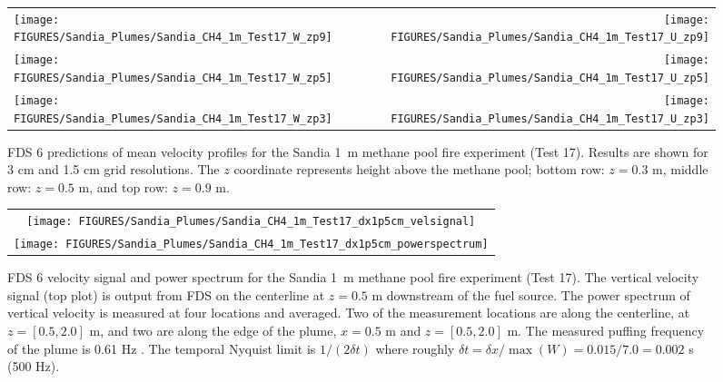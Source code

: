 \begin{figure}[p]
\begin{tabular*}{\textwidth}{l@{\extracolsep{\fill}}r}
\texttt{[image: FIGURES/Sandia\_Plumes/Sandia\_CH4\_1m\_Test17\_W\_zp9]} &
\texttt{[image: FIGURES/Sandia\_Plumes/Sandia\_CH4\_1m\_Test17\_U\_zp9]} \\
\texttt{[image: FIGURES/Sandia\_Plumes/Sandia\_CH4\_1m\_Test17\_W\_zp5]} &
\texttt{[image: FIGURES/Sandia\_Plumes/Sandia\_CH4\_1m\_Test17\_U\_zp5]} \\
\texttt{[image: FIGURES/Sandia\_Plumes/Sandia\_CH4\_1m\_Test17\_W\_zp3]} &
\texttt{[image: FIGURES/Sandia\_Plumes/Sandia\_CH4\_1m\_Test17\_U\_zp3]}
\end{tabular*}
\caption[Sandia 1~m methane pool fire (Test 17) mean velocity profiles.]
{FDS 6 predictions of mean velocity profiles for the Sandia 1~m methane pool fire experiment (Test 17). Results are shown for 3 cm and 1.5 cm grid resolutions. The $z$ coordinate represents height above the methane pool; bottom row: $z=0.3$ m, middle row: $z=0.5$ m, and top row: $z=0.9$ m.}
\label{Sandia_CH4_1m_Test17_velocity}
\end{figure}

\begin{figure}[p]
\begin{center}
\begin{tabular}{c}
\texttt{[image: FIGURES/Sandia\_Plumes/Sandia\_CH4\_1m\_Test17\_dx1p5cm\_velsignal]} \\
\texttt{[image: FIGURES/Sandia\_Plumes/Sandia\_CH4\_1m\_Test17\_dx1p5cm\_powerspectrum]}
\end{tabular}
\end{center}
\caption[Sandia 1~m methane pool fire velocity signal and power spectrum.]
{FDS 6 velocity signal and power spectrum for the Sandia 1~m methane pool fire experiment (Test 17).  The vertical velocity signal (top plot) is output from FDS on the centerline at $z=0.5$ m downstream of the fuel source.  The power spectrum of vertical velocity is measured at four locations and averaged.  Two of the measurement locations are along the centerline, at $z=[0.5, 2.0]$ m, and two are along the edge of the plume, $x = 0.5$ m and $z=[0.5, 2.0]$ m.  The measured puffing frequency of the plume is 0.61 Hz \cite{Tieszen:2002}.  The temporal Nyquist limit is $1/(2\delta t)$ where roughly $\delta t = \delta x/\max(W) = 0.015/7.0 = 0.002$ s (500 Hz).}
\label{Sandia_CH4_1m_Test17_spectrum}
\end{figure}

